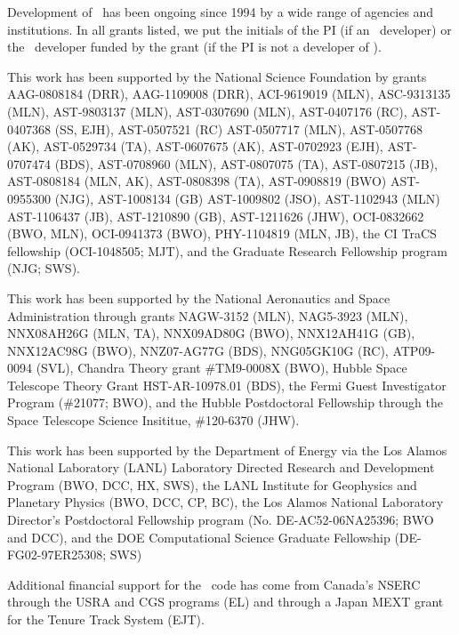 
\acknowledgments

Development of \enzo\ has been ongoing since 1994 by a wide range of
agencies and institutions.  In all grants listed, we put the
initials of the PI (if an \enzo\ developer) or the \enzo\ developer
funded by the grant (if the PI is not a developer of \enzo).

This work has been supported by the National Science Foundation by
grants
AAG-0808184 (DRR),
AAG-1109008 (DRR),
ACI-9619019 (MLN),
ASC-9313135 (MLN),
AST-9803137 (MLN), 
AST-0307690 (MLN), 
AST-0407176 (RC),
AST-0407368 (SS, EJH),
AST-0507521 (RC) 
AST-0507717 (MLN), 
AST-0507768 (AK),
AST-0529734 (TA),
AST-0607675 (AK),
AST-0702923 (EJH),
AST-0707474 (BDS), 
AST-0708960 (MLN), 
AST-0807075 (TA),
AST-0807215 (JB),
AST-0808184 (MLN, AK),
AST-0808398 (TA),
AST-0908819 (BWO) 
AST-0955300 (NJG),
AST-1008134 (GB) 
AST-1009802 (JSO), 
AST-1102943 (MLN)
AST-1106437 (JB),
AST-1210890 (GB),
AST-1211626 (JHW),
OCI-0832662 (BWO, MLN),
OCI-0941373 (BWO),
PHY-1104819 (MLN, JB),
the CI TraCS fellowship (OCI-1048505; MJT),
and the Graduate Research Fellowship program (NJG; SWS).

This work has been supported by the National Aeronautics and Space
Administration through grants
NAGW-3152 (MLN),
NAG5-3923 (MLN),
NNX08AH26G (MLN, TA),
NNX09AD80G (BWO),
NNX12AH41G (GB),
NNX12AC98G (BWO),
NNZ07-AG77G (BDS),
NNG05GK10G (RC),
ATP09-0094 (SVL),
Chandra Theory grant \#TM9-0008X (BWO),
Hubble Space Telescope Theory Grant HST-AR-10978.01 (BDS),
the Fermi Guest Investigator Program (\#21077; BWO),
and the Hubble Postdoctoral Fellowship through the Space Telescope Science
Insititue, \#120-6370 (JHW).

This work has been supported by the Department of Energy via the
Los Alamos National Laboratory (LANL) Laboratory Directed Research and
Development Program (BWO, DCC, HX, SWS), 
the LANL Institute for Geophysics and Planetary Physics (BWO, DCC, CP,
BC),
the Los Alamos National Laboratory Director's Postdoctoral Fellowship
program (No. DE-AC52-06NA25396;
BWO and DCC), and the
DOE Computational Science Graduate Fellowship (DE-FG02-97ER25308; SWS)

Additional financial support for the \enzo\ code has come from
Canada's NSERC through the USRA and CGS programs (EL) and through a 
Japan MEXT grant for the Tenure Track System (EJT).


